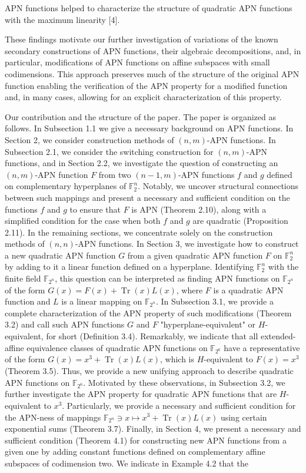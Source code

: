 \documentclass[10pt]{article}
\begin{document}
APN functions helped to characterize the structure of quadratic APN functions with the maximum linearity [4].

These findings motivate our further investigation of variations of the known secondary constructions of APN functions, their algebraic decompositions, and, in particular, modifications of APN functions on affine subspaces with small codimensions. This approach preserves much of the structure of the original APN function enabling the verification of the APN property for a modified function and, in many cases, allowing for an explicit characterization of this property.

Our contribution and the structure of the paper. The paper is organized as follows. In Subsection 1.1 we give a necessary background on APN functions. In Section 2, we consider construction methods of $(n, m)$-APN functions. In Subsection 2.1, we consider the switching construction for $(n, m)$-APN functions, and in Section 2.2, we investigate the question of constructing an $(n, m)$-APN function $F$ from two $(n-1, m)$-APN functions $f$ and $g$ defined on complementary hyperplanes of $\mathbb{F}_{2}^{n}$. Notably, we uncover structural connections between such mappings and present a necessary and sufficient condition on the functions $f$ and $g$ to ensure that $F$ is APN (Theorem 2.10), along with a simplified condition for the case when both $f$ and $g$ are quadratic (Proposition 2.11). In the remaining sections, we concentrate solely on the construction methods of $(n, n)$-APN functions. In Section 3, we investigate how to construct a new quadratic APN function $G$ from a given quadratic APN function $F$ on $\mathbb{F}_{2}^{n}$ by adding to it a linear function defined on a hyperplane. Identifying $\mathbb{F}_{2}^{n}$ with the finite field $\mathbb{F}_{2^{n}}$, this question can be interpreted as finding APN functions on $\mathbb{F}_{2^{n}}$ of the form $G(x)=F(x)+\operatorname{Tr}(x) L(x)$, where $F$ is a quadratic APN function and $L$ is a linear mapping on $\mathbb{F}_{2^{n}}$. In Subsection 3.1, we provide a complete characterization of the APN property of such modifications (Theorem 3.2) and call such APN functions $G$ and $F$ "hyperplane-equivalent" or $H$-equivalent, for short (Definition 3.4). Remarkably, we indicate that all extended-affine equivalence classes of quadratic APN functions on $\mathbb{F}_{2^{6}}$ have a representative of the form $G(x)=x^{3}+\operatorname{Tr}(x) L(x)$, which is $H$-equivalent to $F(x)=x^{3}$ (Theorem 3.5). Thus, we provide a new unifying approach to describe quadratic APN functions on $\mathbb{F}_{2^{6}}$. Motivated by these observations, in Subsection 3.2, we further investigate the APN property for quadratic APN functions that are $H$-equivalent to $x^{3}$. Particularly, we provide a necessary and sufficient condition for the APN-ness of mappings $\mathbb{F}_{2^{n}} \ni x \mapsto x^{3}+\operatorname{Tr}(x) L(x)$ using certain exponential sums (Theorem 3.7). Finally, in Section 4, we present a necessary and sufficient condition (Theorem 4.1) for constructing new APN functions from a given one by adding constant functions defined on complementary affine subspaces of codimension two. We indicate in Example 4.2 that the 
\end{document}
